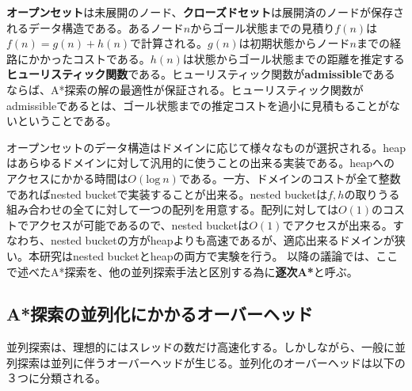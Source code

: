 \documentclass[uplatex]{jsarticle}
\begin{document}
\textbf{オープンセット}は未展開のノード、\textbf{クローズドセット}は展開済のノードが保存されるデータ構造である。あるノード$n$からゴール状態までの見積り$f(n)$は$f(n) = g(n) + h(n)$で計算される。$g(n)$は初期状態からノード$n$までの経路にかかったコストである。$h(n)$は状態からゴール状態までの距離を推定する\textbf{ヒューリスティック関数}である。ヒューリスティック関数が\textbf{admissible}であるならば、A*探索の解の最適性が保証される。ヒューリスティック関数がadmissibleであるとは、ゴール状態までの推定コストを過小に見積もることがないということである。

オープンセットのデータ構造はドメインに応じて様々なものが選択される。heapはあらゆるドメインに対して汎用的に使うことの出来る実装である。heapへのアクセスにかかる時間は$O(\mathrm{log}\: n)$である。一方、ドメインのコストが全て整数であればnested bucketで実装することが出来る。nested bucketは$f, h$の取りうる組み合わせの全てに対して一つの配列を用意する。配列に対しては$O(1)$のコストでアクセスが可能であるので、nested bucketは$O(1)$でアクセスが出来る。すなわち、nested bucketの方がheapよりも高速であるが、適応出来るドメインが狭い。本研究はnested bucketとheapの両方で実験を行う。
以降の議論では、ここで述べたA*探索を、他の並列探索手法と区別する為に\textbf{逐次A*}と呼ぶ。


\subsection{A*探索の並列化にかかるオーバーヘッド}

並列探索は、理想的にはスレッドの数だけ高速化する。しかしながら、一般に並列探索は並列に伴うオーバーヘッドが生じる。並列化のオーバーヘッドは以下の３つに分類される。
\end{document}
